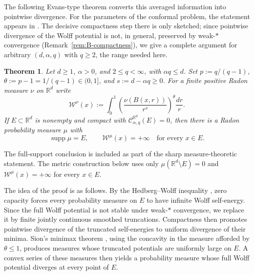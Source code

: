 \documentclass[12pt,oneside,a4paper]{article}
\theoremstyle{mytheorem}
\newtheorem{theorem}[definition]{Theorem}
\theoremstyle{remark}
\theoremstyle{definition}
\begin{document}
The following Evans-type theorem converts this averaged information
into pointwise divergence.  For the parameters of the conformal
problem, the statement appears in \cite[Proposition~2.1]{zbMATH07873599}.
The decisive compactness step there is only sketched; since pointwise
divergence of the Wolff potential is not, in general, preserved by
weak-\(*\) convergence (Remark~\ref{rem:B-compactness}), we give a
complete argument for arbitrary $(d,\alpha,q)$ with $q\ge2$, the range
needed here.




\begin{theorem}\label{thm:evans-wolff}
Let $d\ge1$, $\alpha>0$, and $2\le q<\infty$, with $\alpha q\le d$.
Set $p:=q/(q-1)$, $\theta:=p-1=1/(q-1)\in(0,1]$, and
$s:=d-\alpha q\ge0$.  For a finite positive Radon measure $\nu$ on
$\mathbb{R}^d$ write
\[
 \mathcal{W}^\nu(x)
 :=
 \int_0^1\left(\frac{\nu(B(x,r))}{r^s}\right)^{\theta}\frac{dr}{r}.
\]
If $E\subset\mathbb{R}^d$ is nonempty and compact with
$\mathcal{C}_{\alpha,q}^{\mathbb R^d}(E)=0$, then there is a Radon
probability measure $\mu$ with
\[
 \operatorname{supp}\mu=E,
 \qquad
 \mathcal{W}^\mu(x)=+\infty\quad\text{for every }x\in E.
\]
\end{theorem}

The full-support conclusion is included as part of the sharp
measure-theoretic statement.  The metric construction below uses only
$\mu(\mathbb{R}^d\setminus E)=0$ and
$\mathcal{W}^{\mu}(x)=+\infty$ for every $x\in E$.

The idea of the proof is as follows. By the Hedberg--Wolff inequality \cite[Theorem~1]{zbMATH03801897}, zero capacity forces every probability measure on $E$ to have infinite Wolff self-energy. Since the full Wolff potential is not stable under weak-\(*\) convergence, we replace it by finite jointly continuous smoothed truncations. Compactness then promotes pointwise divergence of the truncated self-energies to uniform divergence of their minima. Sion's minimax theorem \cite[Theorem~3.4]{zbMATH03133049}, using the concavity in the measure afforded by $\theta\leq1$, produces measures whose truncated potentials are uniformly large on $E$. A convex series of these measures then yields a probability measure whose full Wolff potential diverges at every point of $E$.
\end{document}

